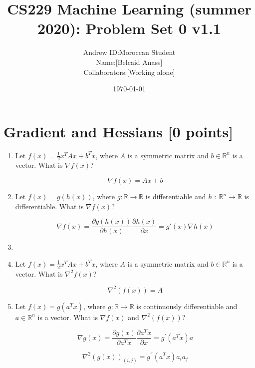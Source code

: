\documentclass[12pt]{article} \usepackage[utf8]{inputenc}
\title{CS229 Machine Learning (summer 2020): Problem Set 0
{\color{red} v1.1}
}
\author{
\begin{tabular}{rl}
Andrew ID: & Moroccan Student\\
Name: & [Belcaid Anass] \\
Collaborators: & [Working alone]
\end{tabular}
}
\date{\today}
\begin{document}
\maketitle



\section{Gradient and Hessians [0 points]}
\begin{enumerate}
  \item Let $f(x) = \frac{1}{2} x^TAx + b^Tx$, where $A$ is a
    symmetric matrix and $b\in\mathbb{R}^n$ is a vector. What is $\nabla
    f(x)$?
    \begin{solution}
      \begin{equation}
      \nabla f(x) = A x + b 
    \end{equation}
    \end{solution}
  \item Let $f(x) = g(h(x))$, where $g: \mathbb{R}\rightarrow \mathbb{R}$ is
    differentiable and $h\;:\: \mathbb{R}^n\rightarrow \mathbb{R}$ is
    differentiable. What is $\nabla f(x)$?
    \begin{solution}
      \begin{equation}
      \nabla f(x) = \dfrac{\partial g(h(x))}{\partial h(x)} \dfrac{\partial h(x)}{\partial x} 
      = g'(x)\nabla h(x)
    \end{equation}
    \end{solution}
  \item 
  \item Let $f(x) = \frac{1}{2} x^TAx + b^Tx$, where $A$ is a
    symmetric matrix and $b\in\mathbb{R}^n$ is a vector. What is $\nabla^2f(x)$?
    \begin{solution}
      \begin{equation}
      \nabla^2(f(x)) = A
    \end{equation}
    \end{solution}
  \item Let $f(x) = g(a^Tx)$, where $g:\mathbb{R}\rightarrow \mathbb{R}$ is
    continuously differentiable and $a\in \mathbb{R}^n$ is a vector. What  is $\nabla f(x)$ and $\nabla^2(f(x))$?
    \begin{solution}
      \begin{equation}
      \nabla g(x)  = \dfrac{\partial g(x)}{\partial a^Tx} \dfrac{\partial a^T x
      }{\partial x} = g^{'}(a^Tx) a
    \end{equation}

    \begin{equation}
      \nabla^2(g(x))_{(i,j)} = g^{''}(a^Tx) a_i a_j
    \end{equation}
    \end{solution}
\end{enumerate}
\end{document}
